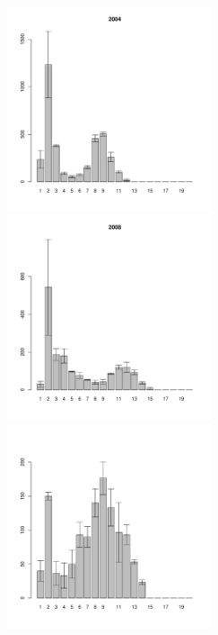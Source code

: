 \begin{figure}[h]

\begin{multicols}{3}
\hfill
\includegraphics[width=60mm]{../White_Sea/Estuatiy_Luvenga/sizestr_2004_.pdf}
\hfill
\includegraphics[width=60mm]{../White_Sea/Estuatiy_Luvenga/sizestr_2008_.pdf}
\hfill
\includegraphics[width=60mm]{../White_Sea/Estuatiy_Luvenga/sizestr_2012_.pdf}
\end{multicols}




\end{figure}
